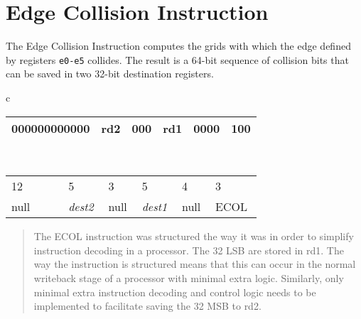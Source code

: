 \section{Edge Collision Instruction}
The Edge Collision Instruction computes the grids with which the edge defined by registers \texttt{e0-e5} collides. The result is a 64-bit sequence of collision bits that can be saved in two 32-bit destination registers.

\begin{table}[H]
\begin{center}
\begin{tabular}{c}
    \begin{tabular}{|m{0.2\linewidth}|m{0.1\linewidth}|m{0.1\linewidth}|m{0.1\linewidth}|m{0.1\linewidth}|m{0.1\linewidth}|}
    \hline
    \hspace*{0.5cm}000000000000 & \hspace*{0.5cm}rd2  & \hspace*{0.5cm}000  & \hspace*{0.5cm}rd1  & \hspace*{0.5cm}0000  & \hspace*{0.5cm}100  \\
    \hline
    \end{tabular} \\
    \begin{tabular}{m{0.2\linewidth}m{0.1\linewidth}m{0.1\linewidth}m{0.1\linewidth}m{0.1\linewidth}m{0.1\linewidth}}
    \hspace*{1.5cm}12 & \hspace*{0.5cm}5  & \hspace*{0.5cm}3  & \hspace*{0.5cm}5  & \hspace*{0.5cm}4  & \hspace*{0.5cm}3  \\
    \hspace*{1.3cm}null &  \hspace*{0.5cm}\textit{dest2} & \hspace*{0.5cm}null  & \hspace*{0.5cm}\textit{dest1}  &  \hspace*{0.5cm}null & \hspace*{0.25cm}ECOL  \\
    \end{tabular}
\end{tabular}
\end{center}
\end{table}

\begin{quote}{}
    The ECOL instruction was structured the way it was in order to simplify instruction decoding in a processor. The 32 \gls{LSB} are stored in rd1. The way the instruction is structured means that this can occur in the normal writeback stage of a processor with minimal extra logic. Similarly, only minimal extra instruction decoding and control logic needs to be implemented to facilitate saving the 32 \gls{MSB} to rd2.
\end{quote}